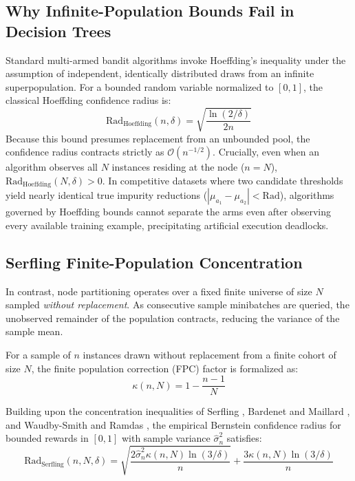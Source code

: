 \subsection{Why Infinite-Population Bounds Fail in Decision Trees}
Standard multi-armed bandit algorithms invoke Hoeffding's inequality under the assumption of independent, identically distributed draws from an infinite superpopulation. For a bounded random variable normalized to $[0, 1]$, the classical Hoeffding confidence radius is:
\begin{equation}
\text{Rad}_{\text{Hoeffding}}(n, \delta) = \sqrt{\frac{\ln(2/\delta)}{2n}}
\end{equation}
Because this bound presumes replacement from an unbounded pool, the confidence radius contracts strictly as $\mathcal{O}(n^{-1/2})$. Crucially, even when an algorithm observes all $N$ instances residing at the node ($n = N$), $\text{Rad}_{\text{Hoeffding}}(N, \delta) > 0$. In competitive datasets where two candidate thresholds yield nearly identical true impurity reductions ($|\mu_{a_1} - \mu_{a_2}| < \text{Rad}$), algorithms governed by Hoeffding bounds cannot separate the arms even after observing every available training example, precipitating artificial execution deadlocks.

\subsection{Serfling Finite-Population Concentration}
In contrast, node partitioning operates over a fixed finite universe of size $N$ sampled \textit{without replacement}. As consecutive sample minibatches are queried, the unobserved remainder of the population contracts, reducing the variance of the sample mean.

\begin{definition}
For a sample of $n$ instances drawn without replacement from a finite cohort of size $N$, the finite population correction (FPC) factor is formalized as:
\begin{equation}
\kappa(n, N) = 1 - \frac{n - 1}{N}
\end{equation}
\end{definition}

Building upon the concentration inequalities of Serfling \cite{serfling1974probability}, Bardenet and Maillard \cite{bardenet2015concentration}, and Waudby-Smith and Ramdas \cite{waudbysmith2020confidence}, the empirical Bernstein confidence radius for bounded rewards in $[0, 1]$ with sample variance $\hat{\sigma}_n^2$ satisfies:
\begin{equation}
\text{Rad}_{\text{Serfling}}(n, N, \delta) = \sqrt{\frac{2 \hat{\sigma}_n^2 \kappa(n, N) \ln(3/\delta)}{n}} + \frac{3 \kappa(n, N) \ln(3/\delta)}{n}
\label{eq:serfling_bound}
\end{equation}

